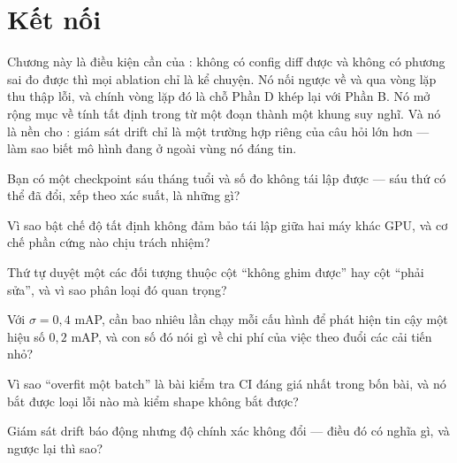 \documentclass[../../deep_learning.tex]{subfiles}
\begin{document}
\section{Kết nối}
Chương này là điều kiện cần của : không có config diff được và không có phương sai đo được thì mọi ablation chỉ là kể chuyện. Nó nối ngược về  và  qua vòng lặp thu thập lỗi, và chính vòng lặp đó là chỗ Phần D khép lại với Phần B. Nó mở rộng mục về tính tất định trong  từ một đoạn thành một khung suy nghĩ. Và nó là nền cho : giám sát drift chỉ là một trường hợp riêng của câu hỏi lớn hơn --- làm sao biết mô hình đang ở ngoài vùng nó đáng tin.

\begin{tukiem}
\item Bạn có một checkpoint sáu tháng tuổi và số đo không tái lập được --- sáu thứ có thể đã đổi, xếp theo xác suất, là những gì?
\item Vì sao bật chế độ tất định không đảm bảo tái lập giữa hai máy khác GPU, và cơ chế phần cứng nào chịu trách nhiệm?
\item Thứ tự duyệt một  các đối tượng thuộc cột ``không ghim được'' hay cột ``phải sửa'', và vì sao phân loại đó quan trọng?
\item Với $\sigma = 0{,}4$ mAP, cần bao nhiêu lần chạy mỗi cấu hình để phát hiện tin cậy một hiệu số $0{,}2$ mAP, và con số đó nói gì về chi phí của việc theo đuổi các cải tiến nhỏ?
\item Vì sao ``overfit một batch'' là bài kiểm tra CI đáng giá nhất trong bốn bài, và nó bắt được loại lỗi nào mà kiểm shape không bắt được?
\item Giám sát drift báo động nhưng độ chính xác không đổi --- điều đó có nghĩa gì, và ngược lại thì sao?
\end{tukiem}
\ifSubfilesClassLoaded{\printbibliography[title={Nguồn}]}{}
\end{document}
